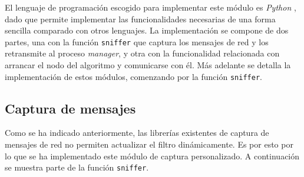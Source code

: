 El lenguaje de programación escogido para implementar este módulo es \textit{Python} \cite{python}, dado que permite implementar las funcionalidades necesarias de una forma sencilla comparado con otros lenguajes. La implementación se compone de dos partes, una con la función \texttt{sniffer} que captura los mensajes de red y los retransmite al proceso \textit{manager}, y otra con la funcionalidad relacionada con arrancar el nodo del algoritmo y comunicarse con él. Más adelante se detalla la implementación de estos módulos, comenzando por la función \texttt{sniffer}.

\subsection{Captura de mensajes}

Como se ha indicado anteriormente, las librerías existentes de captura de mensajes de red no permiten actualizar el filtro dinámicamente. Es por esto por lo que se ha implementado este módulo de captura personalizado. A continuación se muestra parte de la función \texttt{sniffer}.


